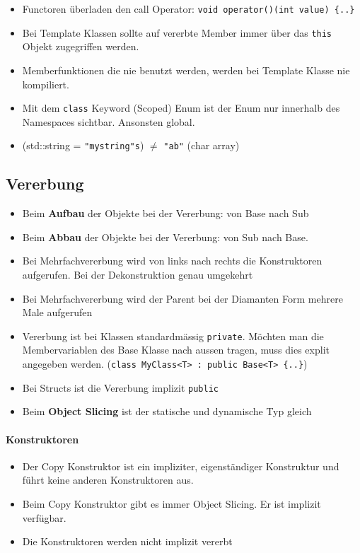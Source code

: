 \begin{itemize}
	\item Functoren überladen den call Operator: \lstinline|void operator()(int value) {..}|
	\item Bei Template Klassen sollte auf vererbte Member immer über das \lstinline|this| Objekt zugegriffen werden. 
	\item Memberfunktionen die nie benutzt werden, werden bei Template Klasse nie kompiliert.
	\item Mit dem \lstinline|class| Keyword (Scoped) Enum ist der Enum nur innerhalb des Namespaces sichtbar. Ansonsten global.
	\item (std::string = \lstinline|"mystring"s|) $\neq$ \lstinline|"ab"| (char array)
\end{itemize}

\subsection{Vererbung}
\begin{itemize}
	\item Beim \textbf{Aufbau} der Objekte bei der Vererbung: von Base	nach Sub	
	\item Beim \textbf{Abbau} der Objekte bei der Vererbung: von Sub nach	Base.	 
	\item Bei Mehrfachvererbung wird von links nach rechts die Konstruktoren aufgerufen. Bei der Dekonstruktion genau umgekehrt
	\item Bei Mehrfachvererbung wird der Parent bei der Diamanten Form mehrere Male aufgerufen
	\item Vererbung ist bei Klassen standardmässig \lstinline|private|. Möchten man die Membervariablen des Base Klasse nach aussen tragen, muss dies explit angegeben werden. (\lstinline|class MyClass<T> : public Base<T> {..}|)
	\item Bei Structs ist die Vererbung implizit \lstinline|public|
	\item Beim \textbf{Object Slicing} ist der statische und dynamische Typ gleich
\end{itemize}
\paragraph{Konstruktoren}
\begin{itemize}
	\item Der Copy Konstruktor ist ein impliziter, eigenständiger Konstruktur und führt keine anderen Konstruktoren aus.	
	\item Beim Copy Konstruktor gibt es immer Object Slicing. Er ist implizit verfügbar.
	\item Die Konstruktoren werden nicht implizit vererbt
\end{itemize}

